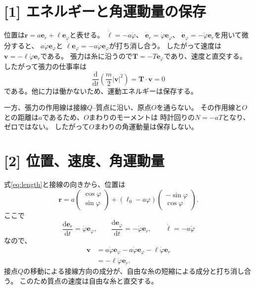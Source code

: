\documentclass[11pt,a4paper]{article}
\begin{document}
\section*{[1] エネルギーと角運動量の保存}
位置は$\boldsymbol{r}=a\boldsymbol{e}_r+\ell\boldsymbol{e}_{\varphi}$と表せる。
$\dot\ell=-a\dot\varphi$、
$\dot{\boldsymbol{e}}_r=\dot\varphi\boldsymbol{e}_{\varphi}$、
$\dot{\boldsymbol{e}}_{\varphi}=-\dot\varphi\boldsymbol{e}_r$を用いて微分すると、
$a\dot\varphi\boldsymbol{e}_{\varphi}$と
$\dot\ell\boldsymbol{e}_{\varphi}=-a\dot\varphi\boldsymbol{e}_{\varphi}$が打ち消し合う。
したがって速度は$\boldsymbol{v}=-\ell\dot\varphi\boldsymbol{e}_r$である。
張力は糸に沿うので$\boldsymbol{T}=-T\boldsymbol{e}_{\varphi}$であり、速度と直交する。
したがって張力の仕事率は
\begin{equation}
  \frac{\mathrm{d}}{\mathrm{d}t}\left(\frac{m}{2}|\boldsymbol{v}|^2\right)
  =\boldsymbol{T}\cdot\boldsymbol{v}=0
\end{equation}
である。他に力は働かないため、運動エネルギーは保存する。

一方、張力の作用線は接線$Q$--質点に沿い、原点$O$を通らない。
その作用線と$O$との距離は$a$であるため、$O$まわりのモーメントは
時計回りの$N=-aT$となり、ゼロではない。
したがって$O$まわりの角運動量は保存しない。

\section*{[2] 位置、速度、角運動量}
式\eqref{eq:length}と接線の向きから、位置は
\begin{equation}
  \boxed{\boldsymbol{r}
  =a\begin{pmatrix}\cos\varphi\\\sin\varphi\end{pmatrix}
   +(\ell_0-a\varphi)\begin{pmatrix}-\sin\varphi\\\cos\varphi\end{pmatrix}.}
\end{equation}
ここで
\begin{equation}
  \frac{\mathrm{d}\boldsymbol{e}_r}{\mathrm{d}t}
  =\dot\varphi\boldsymbol{e}_{\varphi},\qquad
  \frac{\mathrm{d}\boldsymbol{e}_{\varphi}}{\mathrm{d}t}
  =-\dot\varphi\boldsymbol{e}_r,\qquad
  \dot\ell=-a\dot\varphi
\end{equation}
なので、
\begin{align}
  \boldsymbol{v}
  &=a\dot\varphi\boldsymbol{e}_{\varphi}
    -a\dot\varphi\boldsymbol{e}_{\varphi}
    -\ell\dot\varphi\boldsymbol{e}_r\\
  &=\boxed{-\ell\dot\varphi\boldsymbol{e}_r.}
\end{align}
接点$Q$の移動による接線方向の成分が、自由な糸の短縮による成分と打ち消し合う。
このため質点の速度は自由な糸と直交する。
\end{document}
